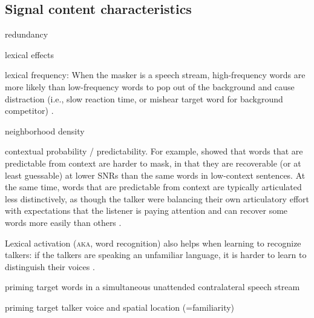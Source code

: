 \subsection{Signal content characteristics}
\begin{itm}
	\item{redundancy}
	\item{lexical effects \citep{HoenEtAl2007, BoulengerEtAl2010, BrouwerEtAl2012}}
	\item{lexical frequency: When the masker is a speech stream, high-frequency words are more likely than low-frequency words to pop out of the background and cause distraction (i.e., slow reaction time, or mishear target word for background competitor) \citep{BoulengerEtAl2010}.}
	\item{neighborhood density}
	\item{contextual probability / predictability.  For example, \citet{LewisEtAl1988} showed that words that are predictable from context are harder to mask, in that they are recoverable (or at least guessable) at lower SNRs than the same words in low-context sentences.  At the same time, words that are predictable from context are typically articulated less distinctively, as though the talker were balancing their own articulatory effort with expectations that the listener is paying attention and can recover some words more easily than others \citep{Wright2004}.  }
	\item{Lexical activation (\textsc{aka}, word recognition) also helps when learning to recognize talkers: if the talkers are speaking an unfamiliar language, it is harder to learn to distinguish their voices \citep{PerrachioneWong2007}.}
	\item{priming target words in a simultaneous unattended contralateral speech stream \citep{RivenezEtAl2006}}
	\item{priming target talker voice and spatial location (=familiarity) \citep{KiddEtAl2005a, KitterickEtAl2010}}
\end{itm}





